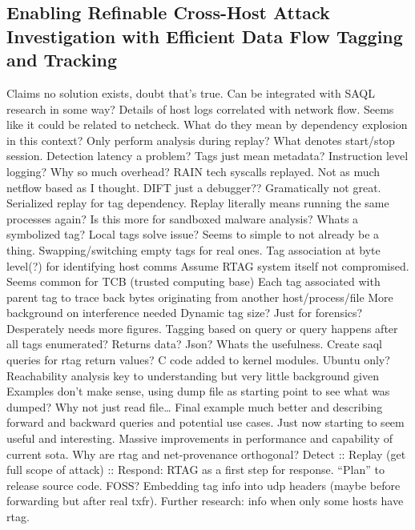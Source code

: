 \documentclass[conference]{IEEEtran}
\begin{document}
\subsection{Enabling Refinable Cross-Host Attack Investigation with Efficient Data Flow Tagging and Tracking\cite{ji_enabling_2018}}
Claims no solution exists, doubt that’s true.
Can be integrated with SAQL research in some way?
Details of host logs correlated with network flow.
Seems like it could be related to netcheck.
What do they mean by dependency explosion in this context?
Only perform analysis during replay? What denotes start/stop session. Detection latency a problem?
Tags just mean metadata?
Instruction level logging? Why so much overhead?
RAIN tech syscalls replayed.
Not as much netflow based as I thought.
DIFT just a debugger??
Gramatically not great.
Serialized replay for tag dependency. Replay literally means running the same processes again?
Is this more for sandboxed malware analysis?
Whats a symbolized tag?
Local tags solve issue? Seems to simple to not already be a thing. Swapping/switching empty tags for real ones.
Tag association at byte level(?) for identifying host comms
Assume RTAG system itself not compromised. Seems common for TCB (trusted computing base)
Each tag associated with parent tag to trace back bytes originating from another host/process/file
More background on interference needed
Dynamic tag size?
Just for forensics?
Desperately needs more figures.
Tagging based on query or query happens after all tags enumerated? Returns data? Json? Whats the usefulness.
Create saql queries for rtag return values?
C code added to kernel modules.
Ubuntu only?
Reachability analysis key to understanding but very little background given
Examples don’t make sense, using dump file as starting point to see what was dumped? Why not just read file…
Final example much better and describing forward and backward queries and potential use cases. Just now starting to seem useful and interesting.
Massive improvements in performance and capability of current sota.
Why are rtag and net-provenance orthogonal?
Detect :: Replay (get full scope of attack) :: Respond: RTAG as a first step for response.
“Plan” to release source code. FOSS?
Embedding tag info into udp headers (maybe before forwarding but after real txfr).
Further research: info when only some hosts have rtag.

\nocite{*}


\end{document}
